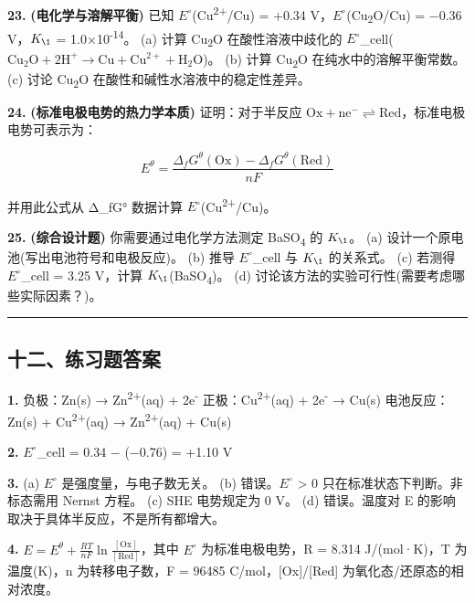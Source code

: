 \documentclass[a4paper,11pt]{ctexart}
\begin{document}
\textbf{23.} \textbf{(电化学与溶解平衡)} 已知 \(E^{\circ}\)(Cu\textsuperscript{2+}/Cu) = +0.34 V，\(E^{\circ}\)(Cu\textsubscript{2}O/Cu) = −0.36 V，\(K_{\1}\) = 1.0×10\textsuperscript{-14}。
(a) 计算 Cu\textsubscript{2}O 在酸性溶液中歧化的 \(E^{\circ}\)\_cell(\(\mathrm{Cu_2O + 2H^+ \to Cu + Cu^{2+} + H_2O}\))。
(b) 计算 Cu\textsubscript{2}O 在纯水中的溶解平衡常数。
(c) 讨论 Cu\textsubscript{2}O 在酸性和碱性水溶液中的稳定性差异。

\textbf{24.} \textbf{(标准电极电势的热力学本质)} 证明：对于半反应 \(\mathrm{Ox + ne^- \rightleftharpoons Red}\)，标准电极电势可表示为：

\[E^\theta = \frac{\Delta_f G^\theta(\mathrm{Ox}) - \Delta_f G^\theta(\mathrm{Red})}{nF}\]

并用此公式从 Δ\_fG° 数据计算 \(E^{\circ}\)(Cu\textsuperscript{2+}/Cu)。

\textbf{25.} \textbf{(综合设计题)} 你需要通过电化学方法测定 BaSO\textsubscript{4} 的 \(K_{\1}\)。
(a) 设计一个原电池(写出电池符号和电极反应)。
(b) 推导 \(E^{\circ}\)\_cell 与 \(K_{\1}\) 的关系式。
(c) 若测得 \(E^{\circ}\)\_cell = 3.25 V，计算 \(K_{\1}\)(BaSO\textsubscript{4})。
(d) 讨论该方法的实验可行性(需要考虑哪些实际因素？)。

\begin{center}\rule{0.5\linewidth}{0.5pt}\end{center}

\subsection{十二、练习题答案}\label{ux5341ux4e8cux7ec3ux4e60ux9898ux7b54ux6848}

\textbf{1.}
负极：Zn(s) → Zn\textsuperscript{2+}(aq) + 2e\textsuperscript{-}
正极：Cu\textsuperscript{2+}(aq) + 2e\textsuperscript{-} → Cu(s)
电池反应：Zn(s) + Cu\textsuperscript{2+}(aq) → Zn\textsuperscript{2+}(aq) + Cu(s)

\textbf{2.} \(E^{\circ}\)\_cell = 0.34 − (−0.76) = +1.10 V

\textbf{3.}
(a) \(E^{\circ}\) 是强度量，与电子数无关。
(b) 错误。\(E^{\circ}\) \textgreater{} 0 只在标准状态下判断。非标态需用 Nernst 方程。
(c) SHE 电势规定为 0 V。
(d) 错误。温度对 E 的影响取决于具体半反应，不是所有都增大。

\textbf{4.} \(E = E^\theta + \frac{RT}{nF}\ln\frac{[\mathrm{Ox}]}{[\mathrm{Red}]}\)，其中 \(E^{\circ}\) 为标准电极电势，R = 8.314 J/(mol·K)，T 为温度(K)，n 为转移电子数，F = 96485 C/mol，{[}Ox{]}/{[}Red{]} 为氧化态/还原态的相对浓度。
\end{document}
